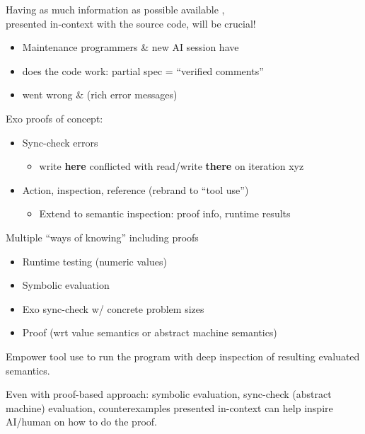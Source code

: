 {\LARGE

Having as much information as possible available ,\\
presented in-context with the source code, will be crucial!
\begin{itemize}
  \item Maintenance programmers \& new AI session have 
  \item {} does the code work: partial spec = ``verified comments''
  \item {} went wrong \&  (rich error messages)
\end{itemize}

\vfill

Exo proofs of concept:
\begin{itemize}
  \item Sync-check errors
  \begin{itemize}
    \item write \textbf{here} conflicted with read/write \textbf{there} on iteration xyz
  \end{itemize}
  \item Action, inspection, reference (rebrand to ``tool use'')
  \begin{itemize}
    \item Extend to semantic inspection: proof info, runtime results
  \end{itemize}
\end{itemize}

\vfill

}

\newpage
{}

{\LARGE
Multiple ``ways of knowing'' including proofs
\begin{itemize}
  \item Runtime testing (numeric values)
  \item Symbolic evaluation
  \item Exo sync-check w/ concrete problem sizes
  \item Proof (wrt value semantics or abstract machine semantics)
\end{itemize}
Empower tool use to run the program with deep inspection of resulting evaluated semantics.

\vfill

Even with proof-based approach: symbolic evaluation, sync-check (abstract machine) evaluation, counterexamples presented in-context can help inspire AI/human on how to do the proof.

\vfill
}

